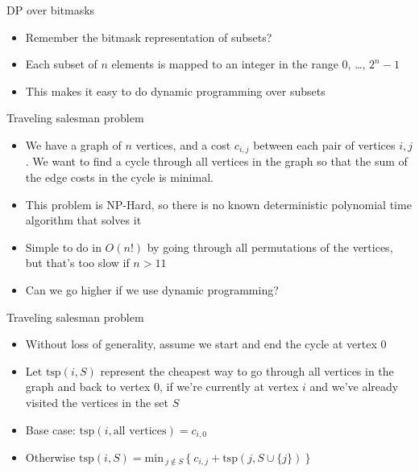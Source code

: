 \documentclass{beamer}
\begin{document}
\begin{frame}[plain]{DP over bitmasks}
    \vspace{40pt}
    \begin{itemize}
        \item Remember the bitmask representation of subsets?
        \item Each subset of $n$ elements is mapped to an integer in the range $0$, \ldots, $2^{n} - 1$
        \item This makes it easy to do dynamic programming over subsets
    \end{itemize}
\end{frame}

\begin{frame}[plain]{Traveling salesman problem}
    \vspace{10pt}

    \begin{itemize}
        \item We have a graph of $n$ vertices, and a cost $c_{i,j}$ between each pair of vertices $i, j$. We want to find a cycle through all vertices in the graph so that the sum of the edge costs in the cycle is minimal.

        \vspace{5pt}
        \item This problem is NP-Hard, so there is no known deterministic polynomial time algorithm that solves it

        \vspace{10pt}
        \item Simple to do in $O(n!)$ by going through all permutations of the vertices, but that's too slow if $n > 11$

        \vspace{10pt}
        \item Can we go higher if we use dynamic programming?
    \end{itemize}
\end{frame}

\begin{frame}[plain]{Traveling salesman problem}
    \vspace{20pt}
    \begin{itemize}
\item Without loss of generality, assume we start and end the cycle at vertex $0$
    \vspace{10pt}

\item Let $\mathrm{tsp}(i, S)$ represent the cheapest way to go through all vertices in the graph and back to vertex $0$, if we're currently at vertex $i$ and we've already visited the vertices in the set $S$

    \vspace{20pt}
\item Base case: $\mathrm{tsp}(i, \textrm{all vertices}) = c_{i,0}$
\item Otherwise $\mathrm{tsp}(i, S) = \mathrm{min}_{\ j \not\in S\ } \{\ c_{i,j} + \mathrm{tsp}(j, S \cup \{j\})\ \}$
    \end{itemize}
\end{frame}
\end{document}
